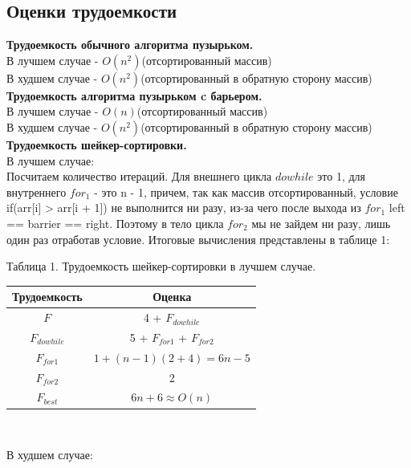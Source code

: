 \documentclass[a4paper, 14pt]{article}
\begin{document}
        \subsection{Оценки трудоемкости}
        \parindent=0cm
		\textbf{Трудоемкость обычного алгоритма пузырьком.}\\
		В лучшем случае - $O(n^2)$(отсортированный массив)\cite{knut}\\
		В худшем случае - $O(n^2)$(отсортированный в обратную сторону массив)\cite{knut}\\
		\textbf{Трудоемкость алгоритма пузырьком c барьером.}\\
		В лучшем случае - $O(n)$(отсортированный массив)\cite{knut}\\
		В худшем случае - $O(n^2)$(отсортированный в обратную сторону массив)\cite{knut}\\
		\textbf{Трудоемкость шейкер-сортировки.}\\
		В лучшем случае: \\
		\parindent=1cm
		Посчитаем количество итераций. Для внешнего цикла $do while$ это 1, для внутреннего $for_{1}$ - это n - 1, причем, так как массив отсортированный, условие if(arr[i] > arr[i + 1]) не выполнится ни разу, из-за чего после выхода из $for_{1}$ left == barrier == right. Поэтому в тело цикла $for_{2}$ мы не зайдем ни разу, лишь один раз отработав условие. Итоговые вычисления представлены в таблице 1:\\
        	\begin{center}
  	Таблица 1. Трудоемкость шейкер-сортировки в лучшем случае.\\
  		
		\begin{tabular}{ | c | c | }
        \hline
		Трудоемкость & Оценка\\ \hline
		$F$ & 4 + $F_{dowhile}$\\ \hline
		$F_{dowhile}$ & 5 + $F_{for1}$ + $F_{for2}$\\ \hline
		$F_{for1}$ & $1 + (n - 1)(2 + 4) = 6n - 5$\\ \hline
		$F_{for2}$ & 2\\ \hline
		\textbf{$F_{best}$} & \textbf{$6n + 6 \approx O(n)$}\\ \hline
		\hline
        \end{tabular}\\
        \end{center}
		В худшем случае: \\
\end{document}
